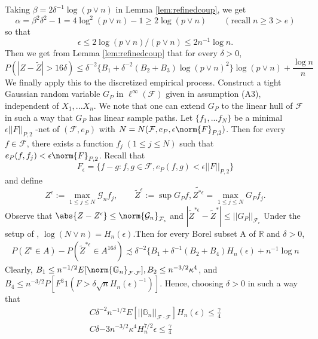 \documentclass[uplatex,dvipdfmx]{jsarticle}
\begin{document}
Taking $\beta = 2 \delta^{-1} \log (p \lor n ) $ in Lemma \ref{lem:refinedcoup}, we get 
\[\alpha = \beta^2 \delta^2 -1  = 4 \log ^2 ( p \lor n) -1 \geq 2 \log ( p \lor n)\qquad(\text{recall}\;n \geq 3 > e)\]
so that
\[\epsilon \leq 2 \log( p \lor n) / ( p \lor n ) \leq 2 n^{-1} \log n.\]
Then we get from Lemma \ref{lem:refinedcoup} that for every $\delta > 0 $, 
\[P( | Z  - \tilde{Z} | >  16 \delta ) \leq \delta^{-2}\{ B_1 + \delta^{-2} ( B_2 + B_3)\log(p \lor n )^2\} \log ( p \lor n) + \frac{ \log n }{n}\]
We finally apply this to the discretized empirical process. Construct a tight Gaussian random variable $G_P$ in $ \ell^ \infty ( \mathcal{F}) $ given in assumption (A3), independent of $ X_1, ...X_n$. We note that one can extend $G_P$ to the linear hull of $\mathcal{F}$  in such a way that $G_P$ has linear sample paths.
Let $\{ f_1, ... f_N \}$ be a minimal $ \epsilon || F|| _{P,2}$ -net of $( \mathcal{F}, e_P)$ with $ N = N( \mathcal{F}, e_P, \epsilon \norm{ F}_{P,2}) $. Then for every $f\in \mathcal{F}$, there exists a function $f_j\;(1 \leq j \leq N)$ such that $ e_P( f, f_j) < \epsilon \norm{F}_{ P,2}$. Recall that 
\[F_{ \epsilon} = \{ f- g: f, g \in \mathcal{F} , e_P(f,g)< \epsilon || F||_{P,2} \}\]
and define 
\begin{equation*}
    Z^ \epsilon := \max _{ 1 \leq j \leq N} \mathcal{G}_n f _j,\qquad \tilde{Z}^\epsilon:= \sup G_P f , \tilde{Z^{* \epsilon}} = \max_{1 \leq j \leq N} G_P f_j.
\end{equation*}
Observe that $ \abs{Z - Z^ \epsilon}\leq \norm{\mathcal{G}_n}_{ \mathcal{F}_\epsilon} $ and $ | \tilde{Z}^{ * \epsilon} - \tilde{Z}^ { *}  | \leq || G_P ||_{ \mathcal{F}_\epsilon} $
Under the setup of \cite{chernozhukov2014gaussian}, $\log(N \lor n )= H_n (\epsilon) $.Then for every Borel subset A of $\mathbb{R}$ and $\delta>0$, 
\begin{align*}
    P(Z^\epsilon \in A)  - P( \tilde{Z}^{* \epsilon} \in A^{16 \delta})
\precsim \delta^{-2} \{ B_1 + \delta^{-1} ( B_2 + B_4 )H_n (\epsilon) + n^{-1} \log n 
\end{align*}
Clearly, $B_1 \leq n^{-1/2} E[ \norm{\mathbb{G}_n}_{\mathcal{F}\cdot \mathcal{F}} ] , B_2 \leq n^{-3/2} \kappa^4$, and $ B_4 \leq n^{-3/2} P[ F^3 1( F > \delta \sqrt{n} H_n (\epsilon)^{-1})]$. Hence, choosing $\delta >0$ in such a way that 
\begin{align*}
    C \delta^{-2} n^{-1/2} E[ ||\mathbb{G}_n||_{\mathcal{F}\cdot \mathcal{F}}] H_n ( \epsilon) \leq \frac{ \gamma}{4}\\
    C \delta{-3} n^{-3/2} \kappa^4 H_n^{7/2}  \epsilon \leq \frac{\gamma}{4}
 \end{align*}
\end{document}
